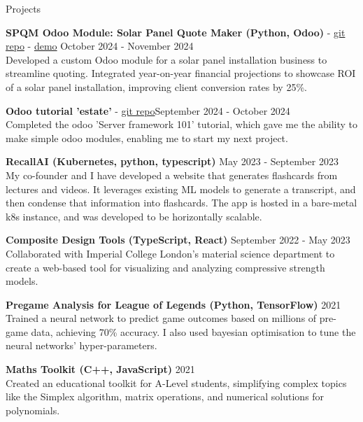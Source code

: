 \documentclass{resume} %
\begin{document}
\begin{rSection}{Projects}
\vspace{-1.25em}

\item \textbf{SPQM Odoo Module: Solar Panel Quote Maker (Python, Odoo)}  - \href{https://github.com/ferdinandhubbard981/spqm}{git repo} - \href{ferdinandhubbard.com/spqm}{demo} \hfill October 2024 - November 2024 \\
Developed a custom Odoo module for a solar panel installation business to streamline quoting. Integrated year-on-year financial projections to showcase ROI of a solar panel installation, improving client conversion rates by 25\%. 

\item \textbf{Odoo tutorial 'estate'} - \href{https://github.com/ferdinandhubbard981/odoo-tutorials}{git repo}\hfill September 2024 - October 2024 \\
{Completed the odoo 'Server framework 101' tutorial, which gave me the ability to make simple odoo modules, enabling me to start my next project.}

\item \textbf{RecallAI (Kubernetes, python, typescript)} \hfill May 2023 - September 2023 \\
{My co-founder and I have developed a website that generates flashcards from lectures and videos. It leverages existing ML models to generate a transcript, and then condense that information into flashcards. The app is hosted in a bare-metal k8s instance, and was developed to be horizontally scalable.}

\item \textbf{Composite Design Tools (TypeScript, React)} \hfill September 2022 - May 2023 \\
Collaborated with Imperial College London's material science department to create a web-based tool for visualizing and analyzing compressive strength models.

\item \textbf{Pregame Analysis for League of Legends (Python, TensorFlow)} \hfill 2021 \\
Trained a neural network to predict game outcomes based on millions of pre-game data, achieving 70\% accuracy. I also used bayesian optimisation to tune the neural networks' hyper-parameters.

\item \textbf{Maths Toolkit (C++, JavaScript)} \hfill 2021 \\
Created an educational toolkit for A-Level students, simplifying complex topics like the Simplex algorithm, matrix operations, and numerical solutions for polynomials.

\end{rSection}
\end{document}
